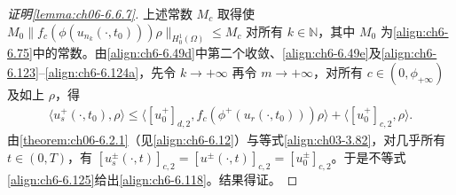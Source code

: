 \documentclass[../../main.tex]{subfiles}%
\begin{document}
\begin{proof}[证明\cref{lemma:ch06-6.6.7}]
上述常数 $M_c$ 取得使 $M_0\|f_c(\phi(u_{n_k}(\cdot,t_0)))\rho\|_{H^1_0(\Omega)}\leqslant M_c$ 对所有 $k\in\mathbb{N}$，其中 $M_0$ 为\eqref{align:ch6-6.75}中的常数。由\eqref{align:ch6-6.49d}中第二个收敛、\eqref{align:ch6-6.49e}及\eqref{align:ch6-6.123}--\eqref{align:ch6-6.124a}，先令 $k\to+\infty$ 再令 $m\to+\infty$，对所有 $c\in(0,\phi_{+\infty})$ 及如上 $\rho$，得
\begin{align}
\langle u^+_s(\cdot,t_0),\rho\rangle
\leqslant\langle[u^+_0]_{d,2},f_c(\phi^+(u_r(\cdot,t_0)))\rho\rangle
+\langle[u^+_0]_{c,2},\rho\rangle. \label{align:ch6-6.125}
\end{align}
由\cref{theorem:ch06-6.2.1}（见\eqref{align:ch6-6.12}）与等式\eqref{align:ch03-3.82}，对几乎所有 $t\in(0,T)$，有 $[u^\pm_s(\cdot,t)]_{c,2}=[u^\pm(\cdot,t)]_{c,2}=[u^\pm_0]_{c,2}$。于是不等式\eqref{align:ch6-6.125}给出\eqref{align:ch6-6.118}。结果得证。
\end{proof}
\end{document}
